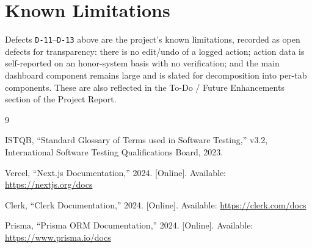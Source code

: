 \documentclass[11pt]{article}
\begin{document}
\section{Known Limitations}

Defects \texttt{D-11}--\texttt{D-13} above are the project's known limitations,
recorded as open defects for transparency: there is no edit/undo of a logged
action; action data is self-reported on an honor-system basis with no
verification; and the main dashboard component remains large and is slated for
decomposition into per-tab components. These are also reflected in the
To-Do / Future Enhancements section of the Project Report.

\begin{thebibliography}{9}

ISTQB, ``Standard Glossary of Terms used in Software Testing,'' v3.2,
International Software Testing Qualifications Board, 2023.

Vercel, ``Next.js Documentation,'' 2024. [Online]. Available:
\url{https://nextjs.org/docs}

Clerk, ``Clerk Documentation,'' 2024. [Online]. Available:
\url{https://clerk.com/docs}

Prisma, ``Prisma ORM Documentation,'' 2024. [Online]. Available:
\url{https://www.prisma.io/docs}

\end{thebibliography}
\end{document}

